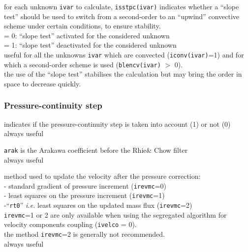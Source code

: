 {for each unknown {\tt ivar} to calculate, {\tt isstpc(ivar)}
indicates whether a ``slope test'' should
be used to switch from a second-order to an ``upwind'' convective
scheme under certain conditions, to ensure stability.\\
\hspace*{1.3cm}= 0: ``slope test'' activated for the considered unknown\\
\hspace*{1.3cm}= 1: ``slope test'' deactivated for the considered unknown\\
useful for all the unknowns {\tt ivar}  which are convected
({\tt iconv(ivar)}=1) and
for which a second-order scheme is used ({\tt blencv(ivar)} $>$ 0).\\
the use of the ``slope test'' stabilises the calculation but may bring
the order in space to decrease quickly.}

\subsubsection{Pressure-continuity step}

{indicates if the pressure-continuity step is taken into account (1) or
not (0)\\
always useful}

{{\tt arak} is the Arakawa coefficient before the
Rhie\& Chow filter\\
always useful}

{method used to update the velocity after the pressure
correction:\\
\hspace*{0,5cm}- standard gradient of pressure increment
({\tt irevmc}=0)\\
\hspace*{0,5cm}- least squares on the pressure increment
({\tt irevmc}=1)\\
\hspace*{0,5cm}-``{\tt rt0}'' {\em i.e.} least squares on the updated mass flux
({\tt irevmc}=2)\\
{\tt irevmc}=1 or 2 are only available when using the segregated algorithm for velocity components coupling ({\tt ivelco} = 0).\\
the method {\tt irevmc}=2 is generally not recommended.\\
always useful}

